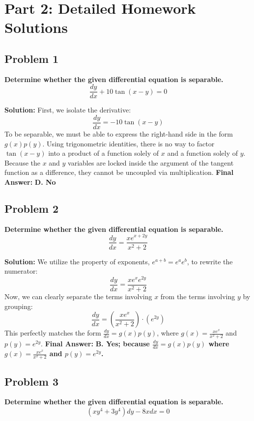 \documentclass[11pt]{article}
\begin{document}
\newpage
\section{Part 2: Detailed Homework Solutions}

\subsection*{Problem 1}
\textbf{Determine whether the given differential equation is separable.}
\[ \frac{dy}{dx} + 10 \tan(x-y) = 0 \]

\textbf{Solution:}
First, we isolate the derivative:
\[ \frac{dy}{dx} = -10 \tan(x-y) \]
To be separable, we must be able to express the right-hand side in the form $g(x)p(y)$. 
Using trigonometric identities, there is no way to factor $\tan(x-y)$ into a product of a function solely of $x$ and a function solely of $y$. Because the $x$ and $y$ variables are locked inside the argument of the tangent function as a difference, they cannot be uncoupled via multiplication.
\newline
\textbf{Final Answer:} \textbf{D. No}

\vspace{0.5cm}
\subsection*{Problem 2}
\textbf{Determine whether the given differential equation is separable.}
\[ \frac{dy}{dx} = \frac{xe^{x+2y}}{x^2+2} \]

\textbf{Solution:}
We utilize the property of exponents, $e^{a+b} = e^a e^b$, to rewrite the numerator:
\[ \frac{dy}{dx} = \frac{x e^x e^{2y}}{x^2+2} \]
Now, we can clearly separate the terms involving $x$ from the terms involving $y$ by grouping:
\[ \frac{dy}{dx} = \left( \frac{xe^x}{x^2+2} \right) \cdot (e^{2y}) \]
This perfectly matches the form $\frac{dy}{dx} = g(x)p(y)$, where $g(x) = \frac{xe^x}{x^2+2}$ and $p(y) = e^{2y}$.
\newline
\textbf{Final Answer:} \textbf{B. Yes; because $\frac{dy}{dx} = g(x)p(y)$ where $g(x) = \frac{xe^x}{x^2+2}$ and $p(y) = e^{2y}$.}

\vspace{0.5cm}
\subsection*{Problem 3}
\textbf{Determine whether the given differential equation is separable.}
\[ (xy^4 + 3y^4)dy - 8x dx = 0 \]
\end{document}
